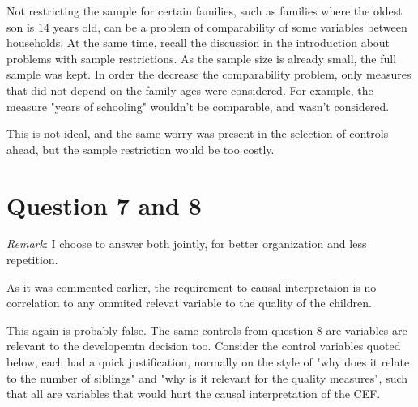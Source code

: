 \documentclass[12pt]{article}
\begin{document}
Not restricting the sample for certain families, such as families where the oldest son is 14 years old, can be a problem of comparability of some variables between households. At the same time, recall the discussion in the introduction about problems with sample restrictions. As the sample size is already small, the full sample was kept. In order the decrease the comparability problem, only measures that did not depend on the family ages were considered. For example, the measure "years of schooling" wouldn't be comparable, and wasn't considered.

This is not ideal, and the same worry was present in the selection of controls ahead, but the sample restriction would be too costly.


\section*{Question 7 and 8}
\textit{Remark}: I choose to answer both jointly, for better organization and less repetition.

As it was commented earlier, the requirement to causal interpretaion is no correlation to any ommited relevat variable to the quality of the children. 

This again is probably false. The same controls from question 8 are variables are relevant to the developemtn decision too. Consider the control variables quoted below, each had a quick justification, normally on the style of "why does it relate to the number of siblings" and "why is it relevant for the quality measures", such that all are variables that would hurt the causal interpretation of the CEF.
\end{document}
